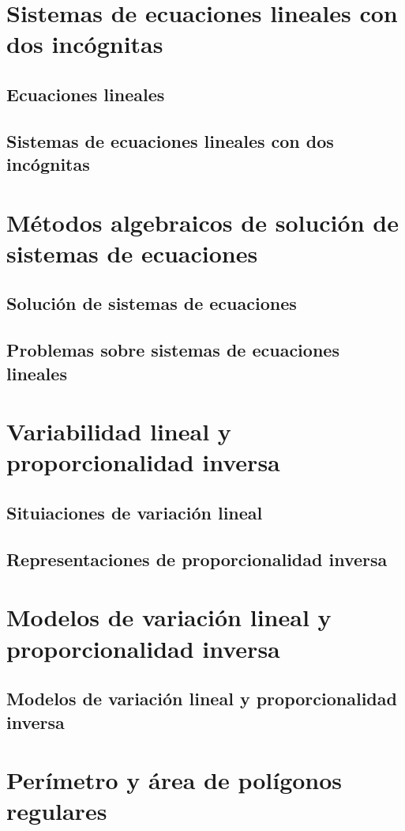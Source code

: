 \documentclass[11pt]{book}
\begin{document}
\section{Sistemas de ecuaciones lineales con dos inc\'ognitas}
\subsection{Ecuaciones lineales}
\subsection{Sistemas de ecuaciones lineales con dos inc\'ognitas}

\section{M\'etodos algebraicos de soluci\'on de sistemas de ecuaciones}
\subsection{Soluci\'on de sistemas de ecuaciones}
\subsection{Problemas sobre sistemas de ecuaciones lineales}

\section{Variabilidad lineal y proporcionalidad inversa}
\subsection{Situiaciones de variación lineal}
\subsection{Representaciones de proporcionalidad inversa}

\section{Modelos de variación lineal y proporcionalidad inversa}
\subsection{Modelos de variación lineal y proporcionalidad inversa}

\section{Per\'imetro y \'area de pol\'igonos regulares}
\end{document}
